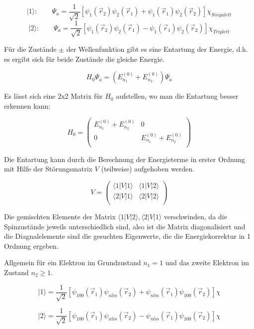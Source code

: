 \[|1\rangle: \qquad \Psi_a = \frac{1}{\sqrt{2}}  [\psi_1(\vec r_2)\psi_2(\vec r_1)  + \psi_1(\vec r_1) \psi_2(\vec r_2)] \chi_{Singulett}\]
\[|2\rangle: \qquad \Psi_a = \frac{1}{\sqrt{2}}  [\psi_1(\vec r_2)\psi_2(\vec r_1)  - \psi_1(\vec r_1) \psi_2(\vec r_2)] \chi_{Triplett}\]


Für die Zustände \(\pm\) der Wellenfunktion gibt es eine Entartung der Energie, d.h. es ergibt sich für beide Zustände die gleiche Energie.

\[ H_0\Psi_a = (E_{n_1}^{(0)}+E_{n_2}^{(0)})\Psi_a\]

Es lässt sich eine 2x2 Matrix für \(H_0\) aufstellen, wo man die Entartung besser erkennen kann:

\[H_0 = \begin{pmatrix} E_{n_1}^{(0)}+E_{n_2}^{(0)} & 0 \\
 0 & E_{n_1}^{(0)}+E_{n_2}^{(0)} \\
\end{pmatrix} \]

Die Entartung kann durch die Berechnung der Energieterme in erster Ordnung mit Hilfe der Störungsmatrix \(V\) (teilweise) aufgehoben werden. 

\[V = \begin{pmatrix} \langle 1|V|1\rangle & \langle 1|V|2\rangle \\
 \langle 2|V|1\rangle & \langle 2|V|2\rangle \\
\end{pmatrix} 
 \]

Die gemischten Elemente der Matrix \(\langle 1|V|2\rangle,\langle 2|V|1\rangle \)  verschwinden, da die Spinzustände jeweils unterschiedlich sind, also ist die Matrix diagonalisiert und die Diagnalelemente sind die gesuchten Eigenwerte, die die Energiekorrektur in 1 Ordnung ergeben.

Allgemein für ein Elektron im Grundzustand \(n_1=1\)  und das zweite Elektron im Zustand \(n_2\geq 1\).

\[|1\rangle  = \frac{1}{\sqrt{2}}  [\psi_{100}(\vec r_1)\psi_{nlm}(\vec r_2)  + \psi_{nlm}(\vec r_1) \psi_{100}(\vec r_2)] \chi \]

\[|2\rangle  = \frac{1}{\sqrt{2}}  [\psi_{100}(\vec r_1)\psi_{nlm}(\vec r_2)  - \psi_{nlm}(\vec r_1) \psi_{100}(\vec r_2)] \chi \]

